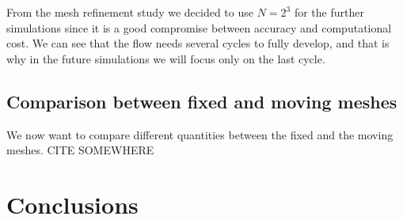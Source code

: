 \documentclass[a4paper,11pt,openright,twoside]{book}
\begin{document}
From the mesh refinement study we decided to use $N=2^3$ for the further simulations since it is a good compromise between accuracy and computational cost.
We can see that the flow needs several cycles to fully develop, and that is why in the future simulations we will focus only on the last cycle.


\section{Comparison between fixed and moving meshes}
We now want to compare different quantities between the fixed and the moving meshes.  CITE \cite{elliott}  \cite{hung} \cite{bertram} SOMEWHERE



\chapter{Conclusions}
\end{document}
